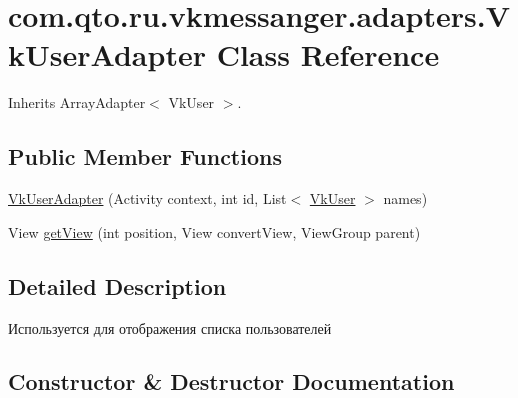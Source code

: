 \hypertarget{classcom_1_1qto_1_1ru_1_1vkmessanger_1_1adapters_1_1_vk_user_adapter}{}\section{com.\+qto.\+ru.\+vkmessanger.\+adapters.\+Vk\+User\+Adapter Class Reference}
\label{classcom_1_1qto_1_1ru_1_1vkmessanger_1_1adapters_1_1_vk_user_adapter}


Inherits Array\+Adapter$<$ Vk\+User $>$.

\subsection*{Public Member Functions}
\begin{DoxyCompactItemize}
\item 
\hyperlink{classcom_1_1qto_1_1ru_1_1vkmessanger_1_1adapters_1_1_vk_user_adapter_a7a88db6b393cb054c22e0a1aad2e4297}{Vk\+User\+Adapter} (Activity context, int id, List$<$ \hyperlink{classcom_1_1qto_1_1ru_1_1vkmessanger_1_1vk_1_1_vk_user}{Vk\+User} $>$ names)
\item 
View \hyperlink{classcom_1_1qto_1_1ru_1_1vkmessanger_1_1adapters_1_1_vk_user_adapter_a7987defb93573e0be612264de348bd72}{get\+View} (int position, View convert\+View, View\+Group parent)
\end{DoxyCompactItemize}


\subsection{Detailed Description}
Используется для отображения списка пользователей 

\subsection{Constructor \& Destructor Documentation}
\hypertarget{classcom_1_1qto_1_1ru_1_1vkmessanger_1_1adapters_1_1_vk_user_adapter_a7a88db6b393cb054c22e0a1aad2e4297}{}
